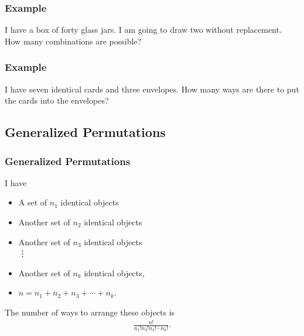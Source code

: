 \begin{frame}
  \frametitle{Example}

  I have a box of forty glass jars. I am going to draw two without
  replacement. How many combinations are possible?

\end{frame}


\begin{frame}
  \frametitle{Example}

  I have seven identical cards and three envelopes. How many ways are
  there to put the cards into the envelopes?

\end{frame}






\subsection{Generalized Permutations}

\begin{frame}
  \frametitle{Generalized Permutations}

  I have
  \begin{itemize}
  \item A set of $n_1$ identical objects
  \item Another set of $n_2$ identical objects 
  \item Another set of $n_3$ identical objects \\
    \vdots
  \item Another set of $n_k$ identical objects, \\
  \item $n=n_1+n_2+n_3+\cdots+n_k$.
  \end{itemize}

  The number of ways to arrange these objects is 
  \begin{eqnarray*}
    \frac{n!}{n_1! n_2! n_3! \cdots n_k!}.
  \end{eqnarray*}
  
\end{frame}



